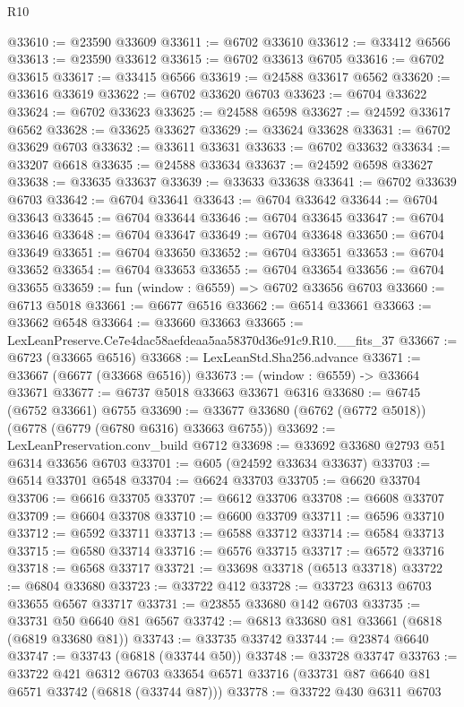 \begin{lexlean}{R10}
\begin{coremodule}
@33610 := @23590 @33609
@33611 := @6702 @33610
@33612 := @33412 @6566
@33613 := @23590 @33612
@33615 := @6702 @33613 @6705
@33616 := @6702 @33615
@33617 := @33415 @6566
@33619 := @24588 @33617 @6562
@33620 := @33616 @33619
@33622 := @6702 @33620 @6703
@33623 := @6704 @33622
@33624 := @6702 @33623
@33625 := @24588 @6598
@33627 := @24592 @33617 @6562
@33628 := @33625 @33627
@33629 := @33624 @33628
@33631 := @6702 @33629 @6703
@33632 := @33611 @33631
@33633 := @6702 @33632
@33634 := @33207 @6618
@33635 := @24588 @33634
@33637 := @24592 @6598 @33627
@33638 := @33635 @33637
@33639 := @33633 @33638
@33641 := @6702 @33639 @6703
@33642 := @6704 @33641
@33643 := @6704 @33642
@33644 := @6704 @33643
@33645 := @6704 @33644
@33646 := @6704 @33645
@33647 := @6704 @33646
@33648 := @6704 @33647
@33649 := @6704 @33648
@33650 := @6704 @33649
@33651 := @6704 @33650
@33652 := @6704 @33651
@33653 := @6704 @33652
@33654 := @6704 @33653
@33655 := @6704 @33654
@33656 := @6704 @33655
@33659 := fun (window : @6559) => @6702 @33656 @6703
@33660 := @6713 @5018
@33661 := @6677 @6516
@33662 := @6514 @33661
@33663 := @33662 @6548
@33664 := @33660 @33663
@33665 := LexLeanPreserve.Ce7e4dac58aefdeaa5aa58370d36e91c9.R10.__fits_37
@33667 := @6723 (@33665 @6516)
@33668 := LexLeanStd.Sha256.advance
@33671 := @33667 (@6677 (@33668 @6516))
@33673 := (window : @6559) -> @33664 @33671
@33677 := @6737 @5018 @33663 @33671 @6316
@33680 := @6745 (@6752 @33661) @6755
@33690 := @33677 @33680 (@6762 (@6772 @5018)) (@6778 (@6779 (@6780 @6316) @33663 @6755))
@33692 := LexLeanPreservation.conv_build @6712
@33698 := @33692 @33680 @2793 @51 @6314 @33656 @6703
@33701 := @605 (@24592 @33634 @33637)
@33703 := @6514 @33701 @6548
@33704 := @6624 @33703
@33705 := @6620 @33704
@33706 := @6616 @33705
@33707 := @6612 @33706
@33708 := @6608 @33707
@33709 := @6604 @33708
@33710 := @6600 @33709
@33711 := @6596 @33710
@33712 := @6592 @33711
@33713 := @6588 @33712
@33714 := @6584 @33713
@33715 := @6580 @33714
@33716 := @6576 @33715
@33717 := @6572 @33716
@33718 := @6568 @33717
@33721 := @33698 @33718 (@6513 @33718)
@33722 := @6804 @33680
@33723 := @33722 @412
@33728 := @33723 @6313 @6703 @33655 @6567 @33717
@33731 := @23855 @33680 @142 @6703
@33735 := @33731 @50 @6640 @81 @6567
@33742 := @6813 @33680 @81 @33661 (@6818 (@6819 @33680 @81))
@33743 := @33735 @33742
@33744 := @23874 @6640
@33747 := @33743 (@6818 (@33744 @50))
@33748 := @33728 @33747
@33763 := @33722
    @421
    @6312
    @6703
    @33654
    @6571
    @33716
    (@33731 @87 @6640 @81 @6571 @33742 (@6818 (@33744 @87)))
@33778 := @33722
    @430
    @6311
    @6703

\end{coremodule}
\end{lexlean}
